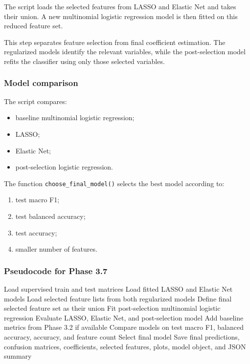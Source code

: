 \documentclass{ipgpmaster}
\begin{document}
The script loads the selected features from LASSO and Elastic Net and takes their union. A new multinomial logistic regression model is then fitted on this reduced feature set.

This step separates feature selection from final coefficient estimation. The regularized models identify the relevant variables, while the post-selection model refits the classifier using only those selected variables.

\subsubsection{Model comparison}

The script compares:

\begin{itemize}
    \item baseline multinomial logistic regression;
    \item LASSO;
    \item Elastic Net;
    \item post-selection logistic regression.
\end{itemize}

The function \texttt{choose\_final\_model()} selects the best model according to:

\begin{enumerate}
    \item test macro F1;
    \item test balanced accuracy;
    \item test accuracy;
    \item smaller number of features.
\end{enumerate}

\subsubsection{Pseudocode for Phase 3.7}

\begin{algorithm}[H]
\caption{Phase 3.7: Final model evaluation}
\begin{algorithmic}[1]
\State Load supervised train and test matrices
\State Load fitted LASSO and Elastic Net models
\State Load selected feature lists from both regularized models
\State Define final selected feature set as their union
\State Fit post-selection multinomial logistic regression
\State Evaluate LASSO, Elastic Net, and post-selection model
\State Add baseline metrics from Phase 3.2 if available
\State Compare models on test macro F1, balanced accuracy, accuracy, and feature count
\State Select final model
\State Save final predictions, confusion matrices, coefficients, selected features, plots, model object, and JSON summary
\end{algorithmic}
\end{algorithm}
\end{document}
